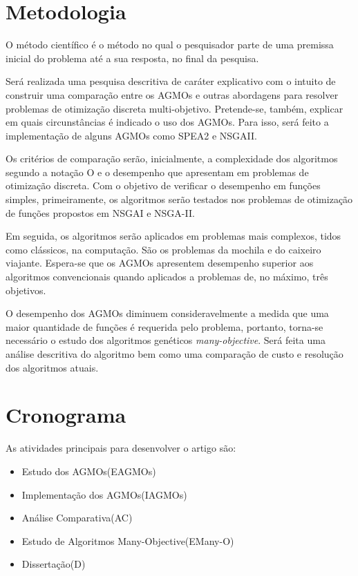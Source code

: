 \documentclass[12pt, %
openright, 
oneside, %
a4paper,    %
brazil]{facom-ufu-abntex2}
\begin{document}
\section{Metodologia}
	
	O método científico é o método no qual o pesquisador parte de uma premissa inicial do problema até a sua resposta, no final da pesquisa.
	
	Será realizada uma pesquisa descritiva de caráter explicativo com o intuito de construir uma comparação entre os AGMOs e outras abordagens para resolver problemas de otimização discreta multi-objetivo. Pretende-se, também, explicar em quais circunstâncias é indicado o uso dos AGMOs. Para isso, será feito a implementação de alguns AGMOs como SPEA2\cite{SPEA2} e NSGAII\cite{NSGAII}.
	
	Os critérios de comparação serão, inicialmente, a complexidade dos algoritmos segundo a notação O e o desempenho que apresentam em problemas de otimização discreta. Com o objetivo de verificar o desempenho em funções simples, primeiramente, os algoritmos serão testados nos problemas de otimização de funções propostos em NSGAI\cite{NSGAI} e NSGA-II\cite{NSGAII}.
	
	Em seguida, os algoritmos serão aplicados em problemas mais complexos, tidos como clássicos, na computação. São os problemas da mochila e do caixeiro viajante. Espera-se que os AGMOs apresentem desempenho superior aos algoritmos convencionais quando aplicados a problemas de, no máximo, três objetivos.
	
	O desempenho dos AGMOs diminuem consideravelmente a medida que uma maior quantidade de funções é requerida pelo problema, portanto, torna-se necessário o estudo dos algoritmos genéticos \textit{many-objective}. Será feita uma análise descritiva do algoritmo bem como uma comparação de custo e resolução dos algoritmos atuais.

\newpage
\section{Cronograma}
	As atividades principais para desenvolver o artigo são:
	
\begin{itemize}
	\item Estudo dos AGMOs(EAGMOs)
	\item Implementação dos AGMOs(IAGMOs) 
	\item Análise Comparativa(AC)
	\item Estudo de Algoritmos Many-Objective(EMany-O)
	\item Dissertação(D)
\end{itemize}
	
\end{document}
